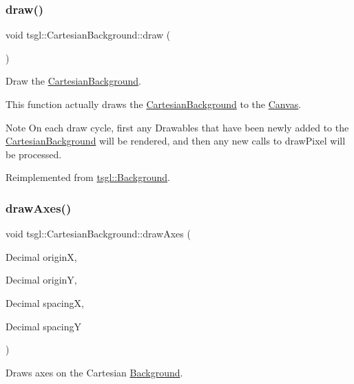 \subsubsection{\texorpdfstring{draw()}{draw()}}
{\footnotesize\ttfamily void tsgl\+::\+Cartesian\+Background\+::draw (\begin{DoxyParamCaption}{ }\end{DoxyParamCaption})\hspace{0.3cm}{\ttfamily [virtual]}}



Draw the \hyperlink{classtsgl_1_1_cartesian_background}{Cartesian\+Background}. 

This function actually draws the \hyperlink{classtsgl_1_1_cartesian_background}{Cartesian\+Background} to the \hyperlink{classtsgl_1_1_canvas}{Canvas}. \begin{DoxyNote}{Note}
On each draw cycle, first any Drawables that have been newly added to the \hyperlink{classtsgl_1_1_cartesian_background}{Cartesian\+Background} will be rendered, and then any new calls to draw\+Pixel will be processed. 
\end{DoxyNote}


Reimplemented from \hyperlink{classtsgl_1_1_background_a62314d455c7b09b2686ba46fd1e5c663}{tsgl\+::\+Background}.

\mbox{\label{classtsgl_1_1_cartesian_background_ad6b87579d02c1ed138d7ace809e705a8}} 
\subsubsection{\texorpdfstring{draw\+Axes()}{drawAxes()}}
{\footnotesize\ttfamily void tsgl\+::\+Cartesian\+Background\+::draw\+Axes (\begin{DoxyParamCaption}\item[{Decimal}]{originX,  }\item[{Decimal}]{originY,  }\item[{Decimal}]{spacingX,  }\item[{Decimal}]{spacingY }\end{DoxyParamCaption})\hspace{0.3cm}{\ttfamily [virtual]}}



Draws axes on the Cartesian \hyperlink{classtsgl_1_1_background}{Background}. 

